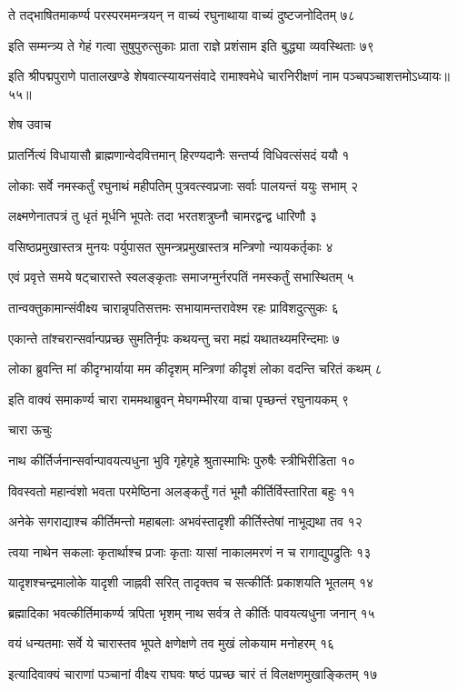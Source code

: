 ते तद्भाषितमाकर्ण्य परस्परममन्त्रयन्
न वाच्यं रघुनाथाया वाच्यं दुष्टजनोदितम् ७८

इति सम्मन्त्र्य ते गेहं गत्वा सुषुपुरुत्सुकाः
प्राता राज्ञे प्रशंसाम इति बुद्ध्या व्यवस्थिताः ७९

इति श्रीपद्मपुराणे पातालखण्डे शेषवात्स्यायनसंवादे रामाश्वमेधे चारनिरीक्षणं नाम पञ्चपञ्चाशत्तमोऽध्यायः॥५५॥


शेष उवाच

प्रातर्नित्यं विधायासौ ब्राह्मणान्वेदवित्तमान्
हिरण्यदानैः सन्तर्प्य विधिवत्संसदं ययौ १

लोकाः सर्वे नमस्कर्तुं रघुनाथं महीपतिम्
पुत्रवत्स्वप्रजाः सर्वाः पालयन्तं ययुः सभाम् २

लक्ष्मणेनातपत्रं तु धृतं मूर्धनि भूपतेः
तदा भरतशत्रुघ्नौ चामरद्वन्द्व धारिणौ ३

वसिष्ठप्रमुखास्तत्र मुनयः पर्युपासत
सुमन्त्रप्रमुखास्तत्र मन्त्रिणो न्यायकर्तृकाः ४

एवं प्रवृत्ते समये षट्चारास्ते स्वलङ्कृताः
समाजग्मुर्नरपतिं नमस्कर्तुं सभास्थितम् ५

तान्वक्तुकामान्संवीक्ष्य चारान्नृपतिसत्तमः
सभायामन्तरावेश्म रहः प्राविशदुत्सुकः ६

एकान्ते तांश्चरान्सर्वान्पप्रच्छ सुमतिर्नृपः
कथयन्तु चरा मह्यं यथातथ्यमरिन्दमाः ७

लोका ब्रुवन्ति मां कीदृग्भार्याया मम कीदृशम्
मन्त्रिणां कीदृशं लोका वदन्ति चरितं कथम् ८

इति वाक्यं समाकर्ण्य चारा राममथाब्रुवन्
मेघगम्भीरया वाचा पृच्छन्तं रघुनायकम् ९

चारा ऊचुः

नाथ कीर्तिर्जनान्सर्वान्पावयत्यधुना भुवि
गृहेगृहे श्रुतास्माभिः पुरुषैः स्त्रीभिरीडिता १०

विवस्वतो महान्वंशो भवता परमेष्ठिना
अलङ्कर्तुं गतं भूमौ कीर्तिर्विस्तारिता बहुः ११

अनेके सगराद्याश्च कीर्तिमन्तो महाबलाः
अभवंस्तादृशी कीर्तिस्तेषां नाभूद्यथा तव १२

त्वया नाथेन सकलाः कृतार्थाश्च प्रजाः कृताः
यासां नाकालमरणं न च रागाद्युपद्रुतिः १३

यादृशश्चन्द्रमालोके यादृशी जाह्नवी सरित्
तादृक्तव च सत्कीर्तिः प्रकाशयति भूतलम् १४

ब्रह्मादिका भवत्कीर्तिमाकर्ण्य त्रपिता भृशम्
नाथ सर्वत्र ते कीर्तिः पावयत्यधुना जनान् १५

वयं धन्यतमाः सर्वे ये चारास्तव भूपते
क्षणेक्षणे तव मुखं लोकयाम मनोहरम् १६

इत्यादिवाक्यं चाराणां पञ्चानां वीक्ष्य राघवः
षष्ठं पप्रच्छ चारं तं विलक्षणमुखाङ्कितम् १७

